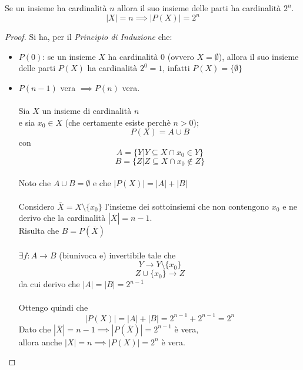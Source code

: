 \documentclass[a4paper,12pt, oneside]{book}
\begin{document}
	\begin{shaded}
		\begin{esempio}
			Se un insieme ha cardinalità $n$ allora il suo insieme delle parti ha cardinalità $2^n$.
			\begin{equation}
				|X| = n \implies |P(X)| = 2^n
			\end{equation}
		\end{esempio}
		\begin{proof}
			Si ha, per il \textit{Principio di Induzione} che:\\
			\begin{itemize}
				\item $P(0)$: se un insieme $X$ ha cardinalità 0 (ovvero $X = \emptyset$), allora il suo insieme delle parti $P(X)$ ha cardinalità $2^0 = 1$, infatti $P(X) = \{ \emptyset \}$
				\item $P(n-1)$ vera $\implies P(n)$ vera.\\\\
				Sia $X$ un insieme di cardinalità $n$\\
				e sia $x_0 \in X$ (che certamente esiste perchè $n > 0$);
				$$P(X) = A \cup B$$
				con 
				$$A = \{Y | Y \subseteq X \cap x_0 \in Y\}$$
				$$B = \{Z | Z \subseteq X \cap x_0 \not\in Z\}$$\\
				Noto che $A \cup B = \emptyset$ e che $|P(X)| = |A| + |B|$\\\\
				Considero $\overline{X} = X \setminus \{ x_0 \}$ l'insieme dei sottoinsiemi che non contengono $x_0$ e ne derivo che la cardinalità $|\overline{X}| = n-1$.\\
				Risulta che $B = P(\overline{X})$\\\\
				$\exists f: A \to B$ (biunivoca e) invertibile tale che
				$$Y \to Y \setminus \{ x_0 \}$$
				$$Z \cup \{ x_0 \} \to Z$$
				da cui derivo che $|A| = |B| = 2^{n-1}$\\\\
				Ottengo quindi che
				$$|P(X)| = |A| + |B| = 2^{n-1} + 2^{n-1} = 2^n$$
				Dato che $|\overline{X}| = n-1 \implies |P(\overline{X})| = 2^{n-1}$ è vera,\\
				allora anche $|X| = n \implies |P(X)| = 2^{n}$ è vera.
			\end{itemize}
		\end{proof}
	\end{shaded}
\end{document}
